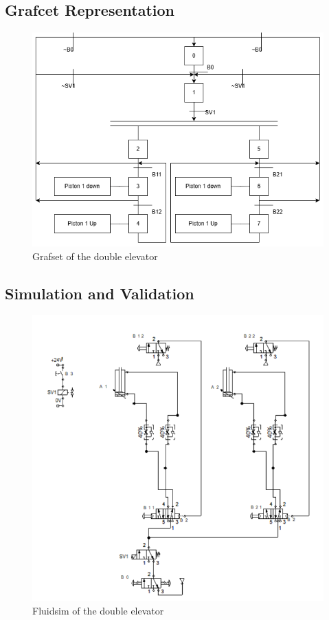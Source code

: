 \subsection{Grafcet Representation} \label{sec:Grafcet_Representation}

\begin{figure}[H]
    \includegraphics[width=16cm]{Images/Q4/graftset.png}
    \centering
    \caption{Grafset of the double elevator}
    \label{fig:grafset}
\end{figure}

\subsection{Simulation and Validation} \label{sec:Simulation_and_Validation}

\begin{figure}[H]
    \includegraphics[width=16cm]{Images/Q4/fluidsim.png}
    \centering
    \caption{Fluidsim of the double elevator}
    \label{fig:fluidsim}
\end{figure}

